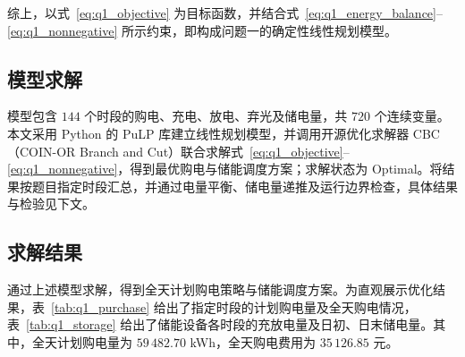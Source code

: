 综上，以式~\eqref{eq:q1_objective} 为目标函数，并结合式~\eqref{eq:q1_energy_balance}--\eqref{eq:q1_nonnegative} 所示约束，即构成问题一的确定性线性规划模型。

\subsection{模型求解}

模型包含 $144$ 个时段的购电、充电、放电、弃光及储电量，共 $720$ 个连续变量。本文采用 Python 的 PuLP 库建立线性规划模型，并调用开源优化求解器 CBC（COIN-OR Branch and Cut）联合求解式~\eqref{eq:q1_objective}--\eqref{eq:q1_nonnegative}，得到最优购电与储能调度方案；求解状态为 Optimal。将结果按题目指定时段汇总，并通过电量平衡、储电量递推及运行边界检查，具体结果与检验见下文。

\subsection{求解结果}

通过上述模型求解，得到全天计划购电策略与储能调度方案。为直观展示优化结果，表~\ref{tab:q1_purchase} 给出了指定时段的计划购电量及全天购电情况，表~\ref{tab:q1_storage} 给出了储能设备各时段的充放电量及日初、日末储电量。其中，全天计划购电量为 $59\,482.70$ kWh，全天购电费用为 $35\,126.85$ 元。

